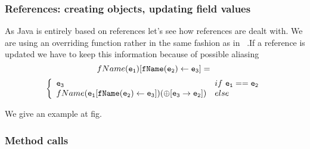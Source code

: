 \subsubsection{References: creating objects, updating field values}
As Java is entirely based on references let's see how references are dealt with. 
We are using an overriding function rather in the same fashion as in ~\cite{B00ppp}.If a reference is updated 
we have to keep this information because of possible aliasing
$$
fName(\tt{e_1} ) [fName(\tt{e_2} ) \leftarrow \tt{e_3} ] = \\
$$
$$
\left\{ \begin{array}{ll}
\tt{e_3} & if \ \tt{e_1} == \tt{e_2} \\
fName(\tt{e_1} [fName(\tt{e_2} ) \leftarrow \tt{e_3} ] )(\oplus [ \tt{e_3} \rightarrow  \tt{e_2} ] ) & else 
\end{array} \right.						
$$

We give an example at fig.%



\subsubsection{Method calls}
